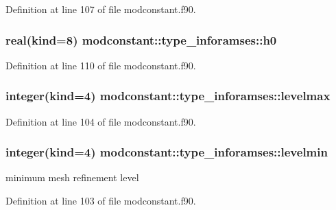 Definition at line 107 of file modconstant.\+f90.

\subsubsection[{\texorpdfstring{h0}{h0}}]{\setlength{\rightskip}{0pt plus 5cm}real(kind=8) modconstant\+::type\+\_\+inforamses\+::h0}\hypertarget{structmodconstant_1_1type__inforamses_a6ceaf1c28dc83b577f72b41e26d988e4}{}\label{structmodconstant_1_1type__inforamses_a6ceaf1c28dc83b577f72b41e26d988e4}


Definition at line 110 of file modconstant.\+f90.

\subsubsection[{\texorpdfstring{levelmax}{levelmax}}]{\setlength{\rightskip}{0pt plus 5cm}integer(kind=4) modconstant\+::type\+\_\+inforamses\+::levelmax}\hypertarget{structmodconstant_1_1type__inforamses_adef8da1578aa4bc629daa618087e153b}{}\label{structmodconstant_1_1type__inforamses_adef8da1578aa4bc629daa618087e153b}


Definition at line 104 of file modconstant.\+f90.

\subsubsection[{\texorpdfstring{levelmin}{levelmin}}]{\setlength{\rightskip}{0pt plus 5cm}integer(kind=4) modconstant\+::type\+\_\+inforamses\+::levelmin}\hypertarget{structmodconstant_1_1type__inforamses_a2398bf44217d43e5b7809a095a5417ee}{}\label{structmodconstant_1_1type__inforamses_a2398bf44217d43e5b7809a095a5417ee}


minimum mesh refinement level 



Definition at line 103 of file modconstant.\+f90.

